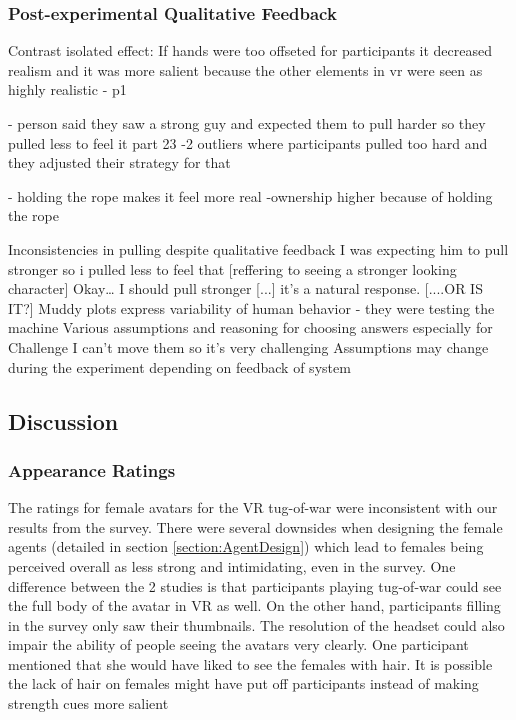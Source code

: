 \clearpage

\subsubsection{Post-experimental Qualitative Feedback}



Contrast isolated effect: If hands were too offseted for participants it decreased realism and it was more salient because the other elements in vr were seen as highly realistic - p1 

- person said they saw a strong guy and expected them to pull harder so they pulled less to feel it part 23 
-2 outliers where participants pulled too hard and they adjusted their strategy for that 



- holding the rope makes it feel more real
-ownership higher because of holding the rope


Inconsistencies in pulling despite qualitative feedback
I was expecting him to pull stronger so i pulled less to feel that
[reffering to seeing a stronger looking character] Okay… I should pull stronger  [...] it’s a natural response. [....OR IS  IT?]
Muddy plots express variability of human behavior - they were testing the machine
Various assumptions and reasoning for choosing answers especially for Challenge
I can't move them so it’s very challenging
Assumptions may change during the experiment depending on feedback of system



\subsection{Discussion}
\subsubsection{Appearance Ratings}
The ratings for female avatars for the VR tug-of-war were inconsistent with our results from the survey. There were several downsides when designing the female agents (detailed in section \ref{section:AgentDesign}) which lead to females being perceived overall as less strong and intimidating, even in the survey. One difference between the 2 studies is that participants playing tug-of-war could see the full body of the avatar in VR as well. On the other hand, participants filling in the survey only saw their thumbnails. The resolution of the headset could also impair the ability of people seeing the avatars very clearly. One participant mentioned that she would have liked to see the females with hair. It is possible the lack of hair on females might have put off participants instead of making strength cues more salient


